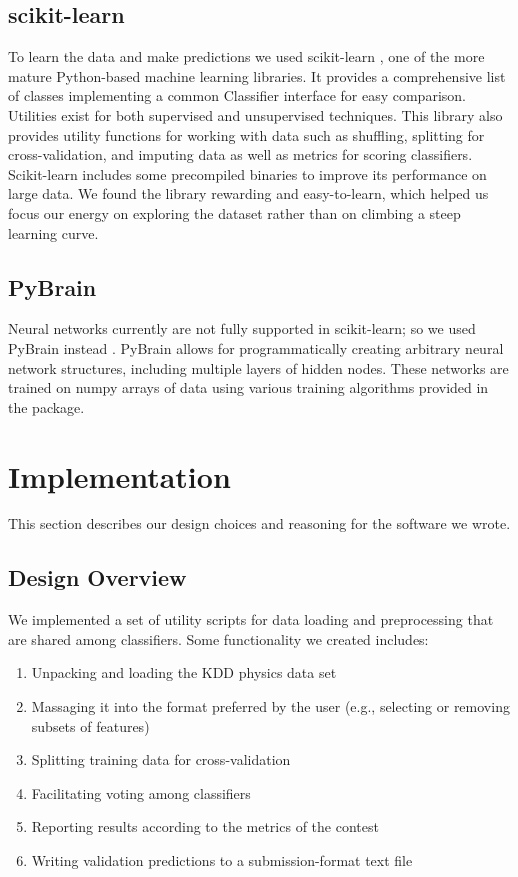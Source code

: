 \documentclass{article}
\begin{document}
\subsection{scikit-learn}

To learn the data and make predictions we used scikit-learn \cite{pedregosa2011scikit}, one of the more mature Python-based machine learning libraries.
It provides a comprehensive list of classes implementing a common Classifier interface for easy comparison.
Utilities exist for both supervised and unsupervised techniques.
This library also provides utility functions for working with data such as shuffling, splitting for cross-validation, and imputing data as well as metrics for scoring classifiers.
Scikit-learn includes some precompiled binaries to improve its performance on large data.
We found the library rewarding and easy-to-learn, which helped us focus our energy on exploring the dataset rather than on climbing a steep learning curve.

\subsection{PyBrain}

Neural networks currently are not fully supported in scikit-learn; so we used PyBrain instead \cite{schaul2010}.
PyBrain allows for programmatically creating arbitrary neural network structures, including multiple layers of hidden nodes.
These networks are trained on numpy arrays of data using various training algorithms provided in the package.


\section{Implementation}
\label{implementation}

This section describes our design choices and reasoning for the software we wrote.

\subsection{Design Overview}

We implemented a set of utility scripts for data loading and preprocessing that are shared among classifiers. Some functionality we created includes:
\begin{enumerate}
\item Unpacking and loading the KDD physics data set
\item Massaging it into the format preferred by the user (e.g., selecting or removing subsets of features)
\item Splitting training data for cross-validation
\item Facilitating voting among classifiers
\item Reporting results according to the metrics of the contest
\item Writing validation predictions to a submission-format text file
\end{enumerate}
\end{document}
